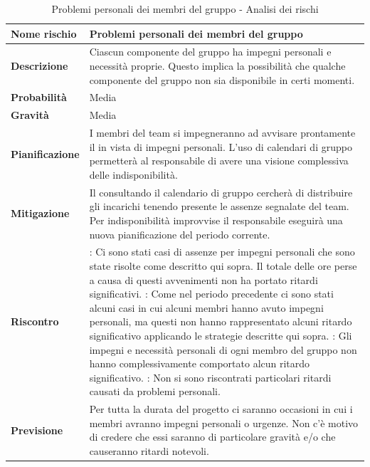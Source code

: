 \documentclass[12pt,a4paper]{article}
\begin{document}
\begin{table}[H]
	\begin{center}
		\begin{tabular}{p{} p{}}
			\toprule
			\textbf{Nome rischio} & \textbf{Problemi personali dei membri del gruppo} \\
			\midrule
			\midrule
			\textbf{Descrizione} & Ciascun componente del gruppo ha impegni personali e necessità proprie. Questo implica la possibilità che qualche componente del gruppo non sia disponibile in certi momenti. \\
			\midrule
			\textbf{Probabilità} & Media \\
			\midrule
			\textbf{Gravità} & Media \\
			\midrule
			\textbf{Pianificazione} & I membri del team si impegneranno ad avvisare prontamente il \PM{} in vista di impegni personali. L’uso di calendari di gruppo permetterà al responsabile di avere una visione complessiva delle indisponibilità.  \\
			\midrule
			\textbf{Mitigazione} & Il \PM{} consultando il calendario di gruppo cercherà di distribuire gli incarichi tenendo presente le assenze segnalate del team. Per indisponibilità improvvise il responsabile eseguirà una nuova pianificazione del periodo corrente. \\
			\midrule
			\textbf{Riscontro} & 
                \textbf{\FA{}}: Ci sono stati casi di assenze per impegni personali che sono state 
                    risolte come descritto qui sopra. Il totale delle ore perse a causa di questi avvenimenti 
                    non ha portato ritardi significativi. \newline
                \textbf{\FAD{}}: Come nel periodo precedente ci sono stati alcuni casi in cui alcuni membri
                    hanno avuto impegni personali, ma questi non hanno rappresentato alcuni ritardo significativo
                    applicando le strategie descritte qui sopra. \newline
                \textbf{\FPA{}}: Gli impegni e necessità personali di ogni membro del gruppo non hanno
                    complessivamente comportato alcun ritardo significativo. \newline
                 \textbf{\FPD{}}: Non si sono riscontrati particolari ritardi causati da problemi personali. \\
			\midrule
			\textbf{Previsione} & Per tutta la durata del progetto ci saranno occasioni in cui i membri avranno impegni personali o urgenze. Non c'è motivo di credere che essi saranno di particolare gravità e/o che causeranno ritardi notevoli. \\
			\bottomrule
		\end{tabular}
		\caption{Problemi personali dei membri del gruppo - Analisi dei rischi}
	\end{center}
\end{table}
\end{document}
